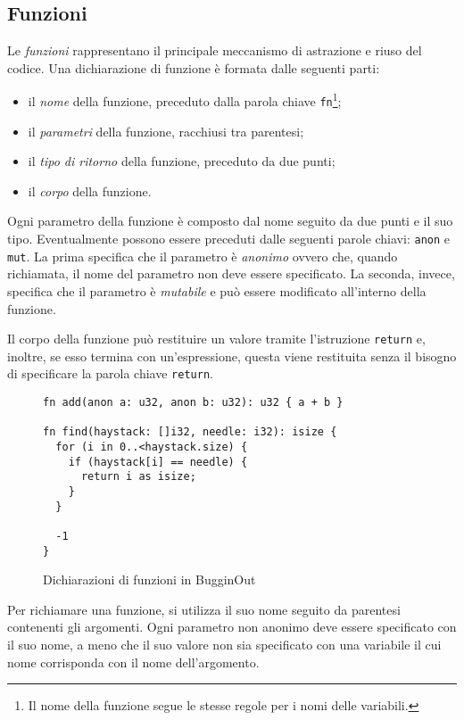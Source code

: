 \subsection{Funzioni}
\label{ssec:funzioni}

Le \emph{funzioni} rappresentano il principale meccanismo di astrazione e riuso del codice. Una dichiarazione di funzione \`e formata dalle seguenti parti:
\begin{itemize}
	\item il \emph{nome} della funzione, preceduto dalla parola chiave \texttt{fn}\footnote{Il nome della funzione segue le stesse regole per i nomi delle variabili.};
	\item il \emph{parametri} della funzione, racchiusi tra parentesi;
	\item il \emph{tipo di ritorno} della funzione, preceduto da due punti;
	\item il \emph{corpo} della funzione.
\end{itemize}

Ogni parametro della funzione \`e composto dal nome seguito da due punti e il suo tipo. Eventualmente possono essere preceduti dalle seguenti parole chiavi: \texttt{anon} e \texttt{mut}. La prima specifica che il parametro \`e \emph{anonimo} ovvero che, quando richiamata, il nome del parametro non deve essere specificato. La seconda, invece, specifica che il parametro \`e \emph{mutabile} e pu\`o essere modificato all'interno della funzione.

Il corpo della funzione pu\`o restituire un valore tramite l'istruzione \texttt{return} e, inoltre, se esso termina con un'espressione, questa viene restituita senza il bisogno di specificare la parola chiave \texttt{return}.

\begin{figure}[H]
	\centering
	\begin{verbatim}
fn add(anon a: u32, anon b: u32): u32 { a + b }

fn find(haystack: []i32, needle: i32): isize {
  for (i in 0..<haystack.size) {
    if (haystack[i] == needle) {
      return i as isize;
    }
  }

  -1
}
	\end{verbatim}
	\caption{Dichiarazioni di funzioni in BugginOut}
	\label{fig:function-declaration-example}
\end{figure}

Per richiamare una funzione, si utilizza il suo nome seguito da parentesi contenenti gli argomenti. Ogni parametro non anonimo deve essere specificato con il suo nome, a meno che il suo valore non sia specificato con una variabile il cui nome corrisponda con il nome dell'argomento.

